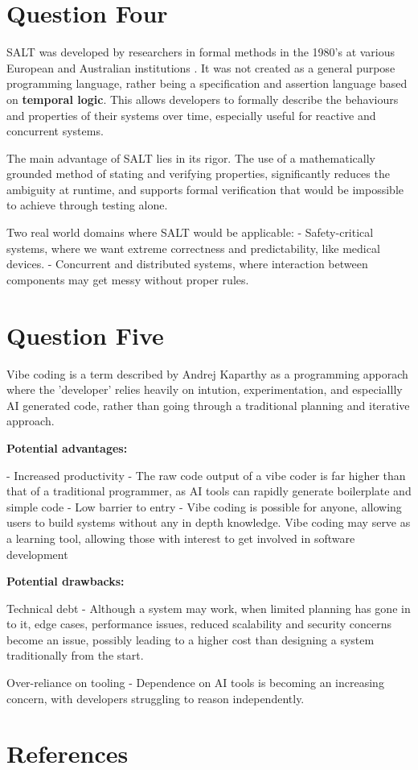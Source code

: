 \documentclass[10pt,a4paper]{article}
\begin{document}
\section{Question Four}

SALT was developed by researchers in formal methods in the 1980's at various European and Australian institutions \citep{salt}. \newline It was not created as a general purpose programming language, rather being a specification and assertion language based on \textbf{temporal logic}. This allows developers to formally describe the behaviours and properties of their systems over time, especially useful for reactive and concurrent systems.

The main advantage of SALT lies in its rigor. The use of a mathematically grounded method of stating and verifying properties, significantly reduces the ambiguity at runtime, and supports formal verification that would be impossible to achieve through testing alone.

Two real world domains where SALT would be applicable:
 \newline - Safety-critical systems, where we want extreme correctness and predictability, like medical devices.
 \newline - Concurrent and distributed systems, where interaction between components may get messy without proper rules.

\section{Question Five}

Vibe coding is a term described by Andrej Kaparthy \citep{karpathy_vibe} as a programming apporach where the 'developer' relies heavily on intution, experimentation, and especiallly AI generated code, rather than going through a traditional planning and iterative approach.

\textbf{Potential advantages:}

- Increased productivity - The raw code output of a vibe coder is far higher than that of a traditional programmer, as AI tools can rapidly generate boilerplate and simple code
\newline - Low barrier to entry - Vibe coding is possible for anyone, allowing users to build systems without any in depth knowledge. Vibe coding may serve as a learning tool, allowing those with interest to get involved in software development

\textbf{Potential drawbacks:}

Technical debt - Although a system may work, when limited planning has gone in to it, edge cases, performance issues, reduced scalability and security concerns become an issue, possibly leading to a higher cost than designing a system traditionally from the start.

Over-reliance on tooling - Dependence on AI tools is becoming an increasing concern, with developers struggling to reason independently.

\section{References}

\end{document}
